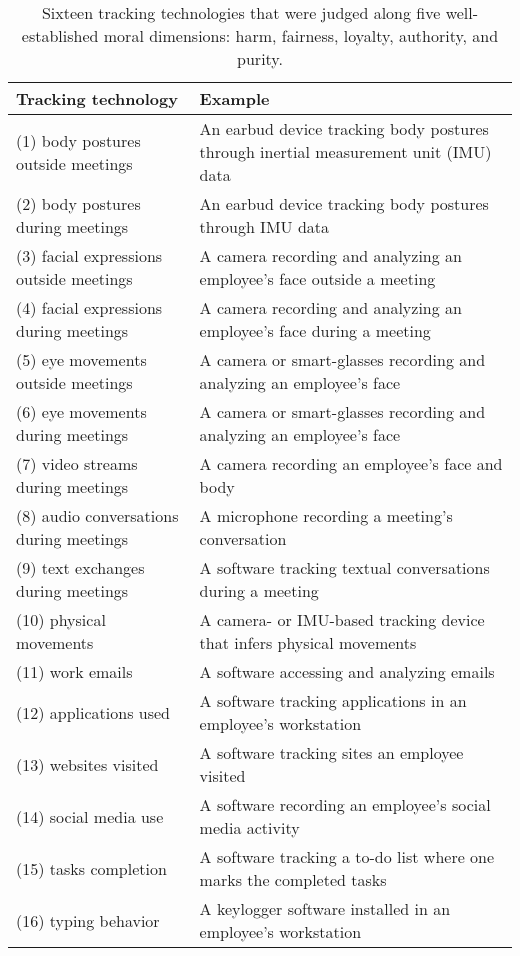 \begin{table*}[t]
    \centering
    \caption{Sixteen tracking technologies that were judged along five well-established moral dimensions: harm, fairness, loyalty, authority, and purity.}
    \begin{tabular}{|l l|}
        \hline
        Tracking technology                     & Example                                                                              \\  \hline

        (1) body postures outside meetings      & An earbud device tracking body postures through inertial measurement unit (IMU) data \\
        (2) body postures during meetings       & An earbud device tracking body postures through IMU data \\
        (3) facial expressions outside meetings & A camera recording and analyzing an employee's face outside a meeting\\
        (4) facial expressions during meetings  & A camera recording and analyzing an employee's face during a meeting\\
        (5) eye movements outside meetings      & A camera or smart-glasses recording and analyzing an employee's face\\
        (6) eye movements during meetings       & A camera or smart-glasses recording and analyzing an employee's face\\
        (7) video streams during meetings       & A camera recording an employee's face and body\\
        (8) audio conversations during meetings & A microphone recording a meeting's conversation\\
        (9) text exchanges during meetings      & A software tracking textual conversations during a meeting\\
        (10) physical movements                 & A camera- or IMU-based tracking device that infers physical movements\\
        (11) work emails                        & A software accessing and analyzing emails\\
        (12) applications used                  & A software tracking applications in an employee's workstation \\
        (13) websites visited                   & A software tracking sites an employee visited\\
        (14) social media use                   & A software recording an employee's social media activity \\
        (15) tasks completion                   & A software tracking a to-do list where one marks the completed tasks  \\
        (16) typing behavior                    & A keylogger software installed in an employee's workstation                          \\
        \hline
    \end{tabular}

    \label{tab:technologies}
\end{table*}


